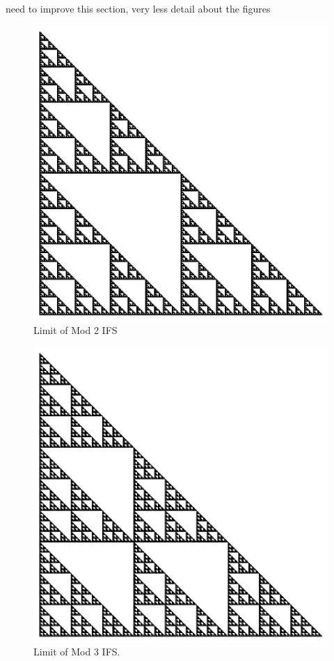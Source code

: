 \documentclass{beamer}
\begin{document}
need to improve this section, very less detail about the figures 
\begin{frame}
    \begin{figure}
        \centering
        \includegraphics[scale=0.5]{GlobalMod2.pdf}
        \caption{Limit of Mod 2 IFS}
    \end{figure}
\end{frame}

\begin{frame}
    \begin{figure}
        \centering
        \includegraphics[scale=0.5]{GlobalMod3.pdf}
        \caption{Limit of Mod 3 IFS.}
    \end{figure}
\end{frame}
\end{document}
